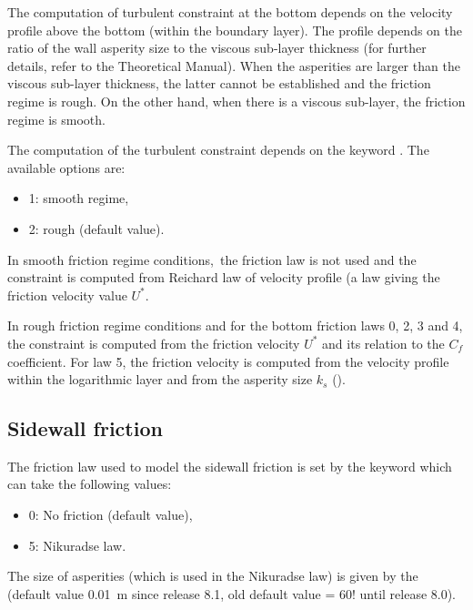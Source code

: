 The computation of turbulent constraint at the bottom depends on the velocity
profile above the bottom (within the boundary layer). The profile depends on
the ratio of the wall asperity size to the viscous sub-layer thickness (for
further details, refer to the Theoretical Manual). When the asperities are
larger than the viscous sub-layer thickness, the latter cannot be established
and the friction regime is rough. On the other hand, when there is a viscous
sub-layer, the friction regime is smooth.

The computation of the turbulent constraint depends on the keyword
. The available options are:

\begin{itemize}
\item  1: smooth regime,

\item  2: rough (default value).
\end{itemize}

In smooth friction regime conditions,~the friction law is not used and the
constraint is computed from Reichard law of velocity profile (a law giving the
friction velocity value $U^{*}$.

In rough friction regime conditions and for the bottom friction laws 0, 2, 3
and 4, the constraint is computed from the friction velocity $U^{*}$ and its
relation to the $C_{f}$ coefficient. For law 5, the friction velocity is
computed from the velocity profile within the logarithmic layer and from the
asperity size $k_{s}$ ().


\subsection{Sidewall friction}

The friction law used to model the sidewall friction is set by the keyword
 which can take the following
values:

\begin{itemize}
\item  0: No friction (default value),

\item  5: Nikuradse law.
\end{itemize}

The size of asperities (which is used in the Nikuradse law) is given by the
 (default value
0.01~m since release 8.1, old default value = 60! until release 8.0).

